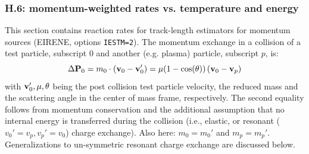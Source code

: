 \documentclass[12pt,dvipdfmx]{article}
\begin{document}
\subsubsection{H.6: momentum-weighted rates vs. temperature and energy}\label{sec1.3.6}
This section  contains reaction rates for track-length estimators for momentum sources (EIRENE, options {\tt IESTM=2}).
The momentum exchange in a collision of a test particle, subscript $0$ and another (e.g. plasma) particle, subscript $p$,
is:
\begin{equation}
\Delta {\bf P}_0 = m_0 \cdot \left({\bf v}_0-{\bf v}'_0\right) = \mu (1-\cos(\theta)) \left({\bf v}_0-{\bf v}_p\right)
\end{equation}
with ${\bf v}_0', \mu, \theta$ being the post collision test particle velocity,
the reduced mass and the scattering angle in the center of mass frame, respectively.
The second equality follows from momentum conservation
and the additional assumption that no internal energy is transferred during
the collision (i.e., elastic, or resonant ($v_0'=v_p , v_p'=v_0$) charge exchange). Also here:  $m_0 = m_0'$ and $m_p = m_p'$. Generalizations to un-symmetric
resonant charge exchange are discussed below.
\end{document}
